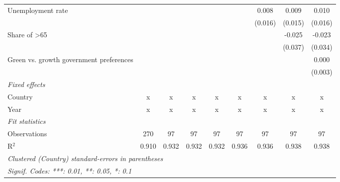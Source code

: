 \begin{table}[htbp]
\begin{tabular}{lcccccccc}
      Unemployment rate                                      &         &         &         &         &         & 0.008   & 0.009   & 0.010\\   
                                                             &         &         &         &         &         & (0.016) & (0.015) & (0.016)\\   
      Share of >65                                           &         &         &         &         &         &         & -0.025  & -0.023\\   
                                                             &         &         &         &         &         &         & (0.037) & (0.034)\\   
      Green vs. growth government preferences                &         &         &         &         &         &         &         & 0.000\\   
                                                             &         &         &         &         &         &         &         & (0.003)\\   
      \emph{Fixed effects}\\
      Country                                                & x       & x       & x       & x       & x       & x       & x       & x\\  
      Year                                                   & x       & x       & x       & x       & x       & x       & x       & x\\  
      \midrule \emph{Fit statistics}\\
      Observations                                           & 270     & 97      & 97      & 97      & 97      & 97      & 97      & 97\\  
      R$^2$                                                  & 0.910   & 0.932   & 0.932   & 0.932   & 0.936   & 0.936   & 0.938   & 0.938\\  
      \midrule
      \multicolumn{9}{l}{\emph{Clustered (Country) standard-errors in parentheses}}\\
      \multicolumn{9}{l}{\emph{Signif. Codes: ***: 0.01, **: 0.05, *: 0.1}}\\
   \end{tabular}
\end{table}


